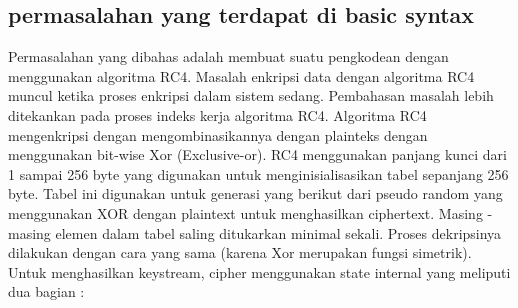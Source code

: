 \subsection {permasalahan yang terdapat di basic syntax}
Permasalahan yang dibahas adalah membuat suatu pengkodean dengan
menggunakan algoritma RC4. Masalah enkripsi data dengan algoritma RC4
muncul ketika proses enkripsi dalam sistem sedang. Pembahasan masalah lebih
ditekankan pada proses indeks kerja algoritma RC4.
Algoritma RC4 mengenkripsi dengan mengombinasikannya dengan
plainteks dengan menggunakan bit-wise Xor (Exclusive-or). RC4 menggunakan
panjang kunci dari 1 sampai 256 byte yang digunakan untuk menginisialisasikan
tabel sepanjang 256 byte. Tabel ini digunakan untuk generasi yang berikut dari
pseudo random yang menggunakan XOR dengan plaintext untuk menghasilkan
ciphertext. Masing - masing elemen dalam tabel saling ditukarkan minimal sekali.
Proses dekripsinya dilakukan dengan cara yang sama (karena Xor merupakan
fungsi simetrik). Untuk menghasilkan keystream, cipher menggunakan state
internal yang meliputi dua bagian :
